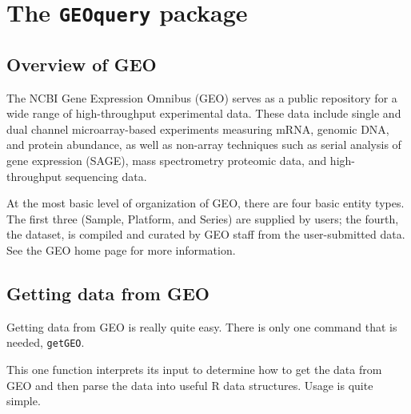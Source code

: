 \documentclass[a4paper]{article}\usepackage[]{graphicx}\usepackage[]{color}
\begin{document}
\section{The \texttt{GEOquery} package}

\subsection{Overview of GEO}

The NCBI Gene Expression Omnibus (GEO) serves as a public repository for a wide range of high-throughput experimental data. These data include single and dual channel microarray-based experiments measuring mRNA, genomic DNA, and protein abundance, as well as non-array techniques such as serial analysis of gene expression (SAGE), mass spectrometry proteomic data, and high-throughput sequencing data.

At the most basic level of organization of GEO, there are four basic entity types. The first three (Sample, Platform, and Series) are supplied by users; the fourth, the dataset, is compiled and curated by GEO staff from the user-submitted data. See the GEO home page for more information.

\subsection{Getting data from GEO}

Getting data from GEO is really quite easy. There is only one command that is needed, \texttt{getGEO}. 

This one function interprets its input to determine how to get the data from GEO and then parse the data into useful R data structures. Usage is quite simple. 
\end{document}
